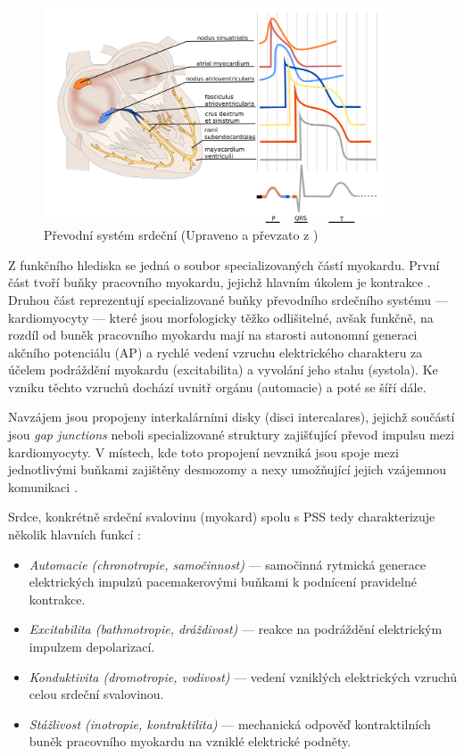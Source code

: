 \begin{figure}[h]
	\begin{center}
		\includegraphics[width=0.9\textwidth]{../assets/anatomy/pss}
		\caption{Převodní systém srdeční (Upraveno a převzato z
			\cite{ecgpediaConduction})}
		\label{fig:pss}
	\end{center}
\end{figure}

Z funkčního hlediska se jedná o soubor specializovaných částí myokardu. První
část tvoří buňky pracovního myokardu, jejichž hlavním úkolem je kontrakce
\cite{Cihak2016}. Druhou část reprezentují specializované buňky převodního
srdečního systému --- kardiomyocyty --- které jsou morfologicky těžko
odlišitelné, avšak funkčně, na rozdíl od buněk pracovního myokardu mají na
starosti autonomní generaci akčního potenciálu (AP) a rychlé vedení vzruchu
elektrického charakteru za účelem podráždění myokardu (excitabilita) a vyvolání
jeho stahu (systola). Ke vzniku těchto vzruchů dochází uvnitř orgánu (automacie)
a poté se šíří dále. 

Navzájem jsou propojeny interkalárními disky (disci intercalares), jejichž
součástí jsou \textit{gap junctions} neboli specializované struktury zajišťující
převod impulsu mezi kardiomyocyty. V místech, kde toto propojení nevzniká jsou
spoje mezi jednotlivými buňkami zajištěny desmozomy a nexy umožňující jejich
vzájemnou komunikaci \cite{Dylevsky2013, Stejfa2006}.

Srdce, konkrétně srdeční svalovinu (myokard) spolu s PSS tedy charakterizuje
několik hlavních funkcí \cite{Stejfa2006}:
\begin{itemize}
	\item \textit{Automacie (chronotropie, samočinnost)} --- samočinná rytmická
	      generace elektrických impulzů pacemakerovými buňkami k podnícení
	      pravidelné kontrakce.
	\item \textit{Excitabilita (bathmotropie, dráždivost)} --- reakce na
	      podráždění elektrickým impulzem depolarizací.
	\item \textit{Konduktivita (dromotropie, vodivost)} --- vedení vzniklých
	      elektrických vzruchů celou srdeční svalovinou.
	\item \textit{Stážlivost (inotropie, kontraktilita)} --- mechanická odpověď
	      kontraktilních buněk pracovního myokardu na vzniklé elektrické
	      podněty.
\end{itemize}

